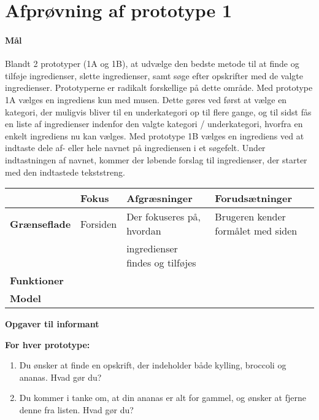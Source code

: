 \section{Afprøvning af prototype 1}

\paragraph{Mål}
Blandt 2 prototyper (1A og 1B), at udvælge den bedste metode til at finde og tilføje ingredienser, slette ingredienser, samt søge efter opskrifter med de valgte ingredienser.
Prototyperne er radikalt forskellige på dette område. Med prototype 1A vælges en ingrediens kun med musen. Dette gøres ved først at vælge en kategori, der muligvis bliver til en underkategori op til flere gange, og til sidst fås en liste af ingredienser indenfor den valgte kategori / underkategori, hvorfra en enkelt ingrediens nu kan vælges. Med prototype 1B vælges en ingrediens ved at indtaste dele af- eller hele navnet på ingrediensen i et søgefelt. Under indtastningen af navnet, kommer der løbende forslag til ingredienser, der starter med den indtastede tekststreng.
\begin{table}[H]
   \centering
    \begin{tabular}{|l|l|l|l|}
        \hline
        ~                    & \textbf{Fokus} & \textbf{Afgræsninger}              & \textbf{Forudsætninger}            \\ \hline
        \textbf{Grænseflade} & Forsiden       & Der fokuseres på, hvordan          & Brugeren kender formålet med siden \\
        ~                    & ~              & ingredienser findes og tilføjes    &                                    \\ \hline 
        \textbf{Funktioner}  & ~              & ~                                  & ~                                  \\  \hline
       \textbf{Model}        & ~              & ~                                  & ~                                  \\
        \hline
    \end{tabular}
    \label{table:afproevning1}
\end{table}	


\textbf{Opgaver til informant}

\textbf{For hver prototype:}
\begin{enumerate}[noitemsep]
\item Du ønsker at finde en opskrift, der indeholder både kylling, broccoli og ananas. Hvad gør du?
\item Du kommer i tanke om, at din ananas er alt for gammel, og ønsker at fjerne denne fra listen. Hvad gør du?
\end{enumerate} 

